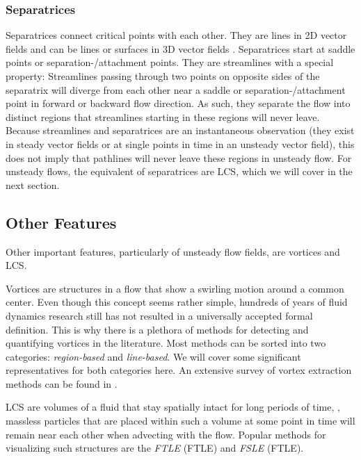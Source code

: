 \subsubsection{Separatrices} %
\label{ssub:separatrices}
%
Separatrices connect critical points with each other.
%
They are lines in \ac{2D} vector fields and can be lines or surfaces in \ac{3D}
vector fields \cite{Helman1989,Helman1991}.
%
Separatrices start at saddle points or separation-/attachment points.
%
They are streamlines with a special property: Streamlines passing through two
points on opposite sides of the separatrix will diverge from each other near a
saddle or separation-/attachment point in forward or backward flow direction.
%
As such, they separate the flow into distinct regions that streamlines starting
in these regions will never leave.
%
Because streamlines and separatrices are an instantaneous observation (they
exist in steady vector fields or at single points in time in an unsteady vector
field), this does not imply that pathlines will never leave these regions in
unsteady flow.
%
For unsteady flows, the equivalent of separatrices are \acl{LCS}, which we will
cover in the next section.
%

%
%
\subsection{Other Features} %
\label{sub:other_features}
%
Other important features, particularly of unsteady flow fields, are vortices and
\acf{LCS}.
%

%
Vortices are structures in a flow that show a swirling motion around a common
center.
%
Even though this concept seems rather simple, hundreds of years of fluid
dynamics research still has not resulted in a universally accepted formal
definition.
%
This is why there is a plethora of methods for detecting and quantifying
vortices in the literature.
%
Most methods can be sorted into two categories: \emph{region-based} and
\emph{line-based}.
%
We will cover some significant representatives for both categories here.
%
An extensive survey of vortex extraction methods can be found in
\cite{Guenther2018}.
%

%
\ac{LCS} are volumes of a fluid that stay spatially intact for long periods of
time, \eg, massless particles that are placed within such a volume at some point
in time will remain near each other when advecting with the flow.
%
Popular methods for visualizing such structures are the
\emph{\acl{FTLE}} (\acs{FTLE}) and \emph{\acl{FSLE}} (\acs{FTLE}).
%

